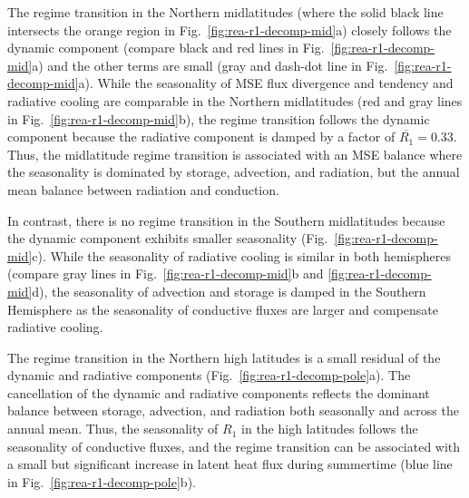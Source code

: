 \documentclass{ametsocV5}
\begin{document}
    The regime transition in the Northern midlatitudes (where the solid black line intersects the orange region in Fig.~\ref{fig:rea-r1-decomp-mid}a) closely follows the dynamic component (compare black and red lines in Fig.~\ref{fig:rea-r1-decomp-mid}a) and the other terms are small (gray and dash-dot line in Fig.~\ref{fig:rea-r1-decomp-mid}a). While the seasonality of MSE flux divergence and tendency and radiative cooling are comparable in the Northern midlatitudes (red and gray lines in Fig.~\ref{fig:rea-r1-decomp-mid}b), the regime transition follows the dynamic component because the radiative component is damped by a factor of $\overline{R_1}=0.33$. Thus, the midlatitude regime transition is associated with an MSE balance where the seasonality is dominated by storage, advection, and radiation, but the annual mean balance between radiation and conduction.  %

    In contrast, there is no regime transition in the Southern midlatitudes because the dynamic component exhibits smaller seasonality (Fig.~\ref{fig:rea-r1-decomp-mid}c). While the seasonality of radiative cooling is similar in both hemispheres (compare gray lines in Fig.~\ref{fig:rea-r1-decomp-mid}b and \ref{fig:rea-r1-decomp-mid}d), the seasonality of advection and storage is damped in the Southern Hemisphere as the seasonality of conductive fluxes are larger and compensate radiative cooling. %

    The regime transition in the Northern high latitudes is a small residual of the dynamic and radiative components (Fig.~\ref{fig:rea-r1-decomp-pole}a). The cancellation of the dynamic and radiative components reflects the dominant balance between storage, advection, and radiation both seasonally and across the annual mean. Thus, the seasonality of $R_1$ in the high latitudes follows the seasonality of conductive fluxes, and the regime transition can be associated with a small but significant increase in latent heat flux during summertime (blue line in Fig.~\ref{fig:rea-r1-decomp-pole}b).

\end{document}
